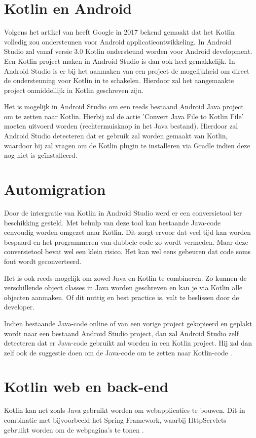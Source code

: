 \section{Kotlin en Android}
\label{sec:kotlinandroid}
Volgens het artikel van \textcite{GoogleSupportKotlin} heeft Google in 2017 bekend gemaakt dat het Kotlin volledig zou ondersteunen voor Android applicatieontwikkeling. In Android Studio zal vanaf versie 3.0 Kotlin ondersteund worden voor Android development. Een Kotlin project maken in Android Studio is dan ook heel gemakkelijk. In Android Studio is er bij het aanmaken van een project de mogelijkheid om direct de ondersteuning voor Kotlin in te schakelen. Hierdoor zal het aangemaakte project onmiddellijk in Kotlin geschreven zijn.

Het is mogelijk in Android Studio om een reeds bestaand Android Java project om te zetten naar Kotlin. Hierbij zal de actie 'Convert Java File to Kotlin File' moeten uitvoerd worden (rechtermuisknop in het Java bestand). Hierdoor zal Android Studio detecteren dat er gebruik zal worden gemaakt van Kotlin, waardoor hij zal vragen om de Kotlin plugin te installeren via Gradle indien deze nog niet is geïnstalleerd.


\section{Automigration}
\label{sec:Automigration}
Door de intergratie van Kotlin in Android Studio werd er een conversietool ter beschikking gesteld. Met behulp van deze tool kan bestaande Java-code eenvoudig worden omgezet naar Kotlin. Dit zorgt ervoor dat veel tijd kan worden bespaard en het programmeren van dubbele code zo wordt vermeden. Maar deze conversietool bevat wel een klein risico. Het kan wel eens gebeuren dat code soms fout wordt geconverteerd. 

Het is ook reeds mogelijk om zowel Java en Kotlin te combineren. Zo kunnen de verschillende object classes in Java worden geschreven en kan je via Kotlin alle objecten aanmaken. Of dit nuttig en best practice is, valt te beslissen door de developer.

Indien bestaande Java-code online of van een vorige project gekopieerd en geplakt wordt naar een bestaand Android Studio project, dan zal Android Studio zelf detecteren dat er Java-code gebruikt zal worden in een Kotlin project. Hij zal dan zelf ook de suggestie doen om de Java-code om te zetten naar Kotlin-code \autocite{Avantica2017}.


\section{Kotlin web en back-end}
\label{sec:kotlincrossplatform}
Kotlin kan net zoals Java gebruikt worden om webapplicaties te bouwen. Dit in combinatie met bijvoorbeeld het Spring Framework, waarbij HttpServlets gebruikt worden om de webpagina's te tonen \autocite{JetBrainsWeb}.

